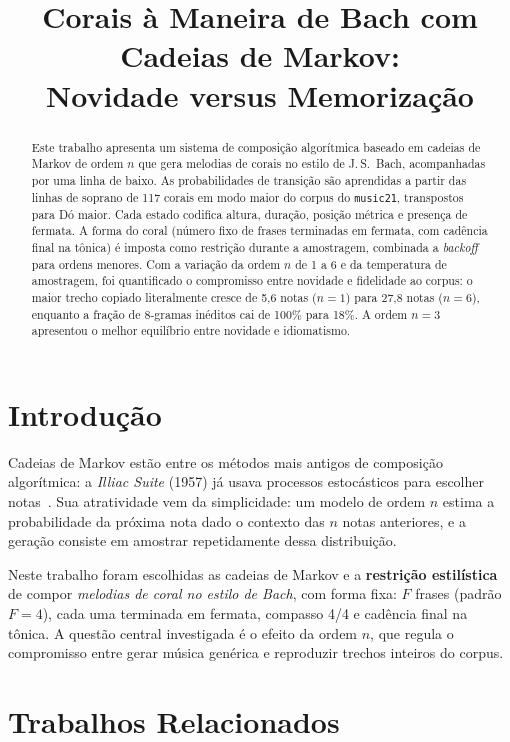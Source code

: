 \documentclass{article}
\title{Corais à Maneira de Bach com Cadeias de Markov: \\ Novidade versus Memorização}
\begin{document}
\maketitle

\begin{abstract}
Este trabalho apresenta um sistema de composição algorítmica baseado em cadeias de Markov de ordem $n$ que gera melodias de corais no estilo de J.\,S.~Bach, acompanhadas por uma linha de baixo. As probabilidades de transição são aprendidas a partir das linhas de soprano de 117 corais em modo maior do corpus do \texttt{music21}, transpostos para Dó maior. Cada estado codifica altura, duração, posição métrica e presença de fermata. A forma do coral (número fixo de frases terminadas em fermata, com cadência final na tônica) é imposta como restrição durante a amostragem, combinada a \emph{backoff} para ordens menores. Com a variação da ordem $n$ de 1 a 6 e da temperatura de amostragem, foi quantificado o compromisso entre novidade e fidelidade ao corpus: o maior trecho copiado literalmente cresce de 5,6 notas ($n=1$) para 27,8 notas ($n=6$), enquanto a fração de 8-gramas inéditos cai de 100\% para 18\%. A ordem $n=3$ apresentou o melhor equilíbrio entre novidade e idiomatismo.
\end{abstract}

\section{Introdução}\label{sec:introducao}

Cadeias de Markov estão entre os métodos mais antigos de composição algorítmica: a \emph{Illiac Suite} (1957) já usava processos estocásticos para escolher notas~\cite{hiller1959}. Sua atratividade vem da simplicidade: um modelo de ordem $n$ estima a probabilidade da próxima nota dado o contexto das $n$ notas anteriores, e a geração consiste em amostrar repetidamente dessa distribuição.

Neste trabalho foram escolhidas as cadeias de Markov e a \textbf{restrição estilística} de compor \emph{melodias de coral no estilo de Bach}, com forma fixa: $F$ frases (padrão $F=4$), cada uma terminada em fermata, compasso 4/4 e cadência final na tônica. A questão central investigada é o efeito da ordem $n$, que regula o compromisso entre gerar música genérica e reproduzir trechos inteiros do corpus.

\section{Trabalhos Relacionados}\label{sec:relacionados}
\end{document}
